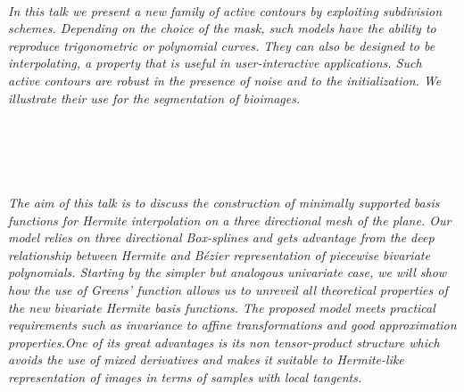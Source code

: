 \begin{multicols}{2}
        \\\\
        \\
        \\\\
\\
      \textit{In this talk we present a new family of active contours by exploiting subdivision schemes. Depending on the choice of the mask, such models have the ability to reproduce trigonometric or polynomial curves. They can also be designed to be interpolating, a property that is useful in user-interactive applications. Such active contours are robust in the presence of noise and to the initialization. We illustrate their use for the segmentation of bioimages.
}\\
\\ 
        \\
        \\\\
\\
      \textit{The aim of this talk is to discuss the construction of minimally supported basis functions for Hermite interpolation on a three directional mesh of the plane. Our model relies on three directional Box-splines and gets advantage from the deep relationship between Hermite and Bézier representation of piecewise bivariate polynomials. Starting by the simpler but analogous univariate case, we will show how the use of Greens' function allows us to unreveil all theoretical properties of the new bivariate Hermite basis functions.
The proposed model meets practical requirements such as invariance to affine transformations and good approximation properties.One of its great advantages is its non tensor-product structure which avoids the use of mixed derivatives and makes it suitable to Hermite-like representation of images in terms of samples with local tangents.}\\
\\ 
        \\
        \\\\
        \\
        \\\\
        \\

\end{multicols}

